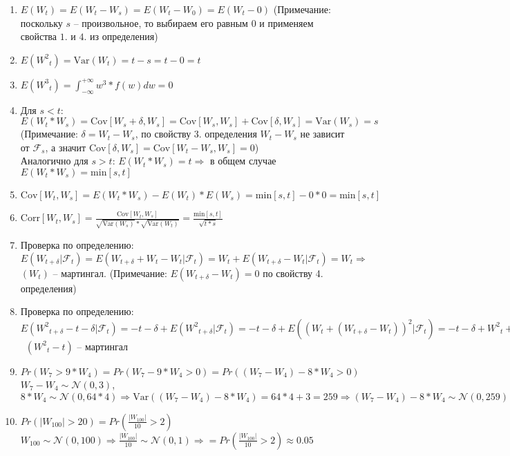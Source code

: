 \documentclass[a4paper]{article}
\begin{document}
\begin{enumerate}
\item $E({W}_t)=E({W}_t-{W}_s)=E({W}_t-{W}_0)=E({W}_t-0)$ (Примечание: поскольку $s$ -- произвольное, то выбираем его равным $0$ и применяем свойства $1.$ и $4.$ из определения)
\item $E({{W}^2}_t)=\text{Var}({W}_t)=t-s=t-0=t$
\item $E({{W}^3}_t)=\int_{-\infty}^{+\infty} w^3 * f(w) dw = 0 $
\item Для $s<t$: $E({W}_t*{W}_s)=\text{Cov}[{W}_s+\delta, {W}_s]=\text{Cov}[{W}_s, {W}_s]+ \text{Cov}[\delta,{W}_s]=\text{Var}({W}_s)=s$ (Примечание: $\delta={W}_t-{W}_s$, по свойству 3. определения ${W}_t-{W}_s$ не зависит от $\mathcal{F}_{s}$, а значит $\text{Cov}[\delta,{W}_s]=\text{Cov}[{W}_t-{W}_s,{W}_s]=0$)
\\ Аналогично для $s>t$: $E({W}_t*{W}_s)=t \Rightarrow$ в общем случае $E({W}_t*{W}_s)=\text{min}[s,t]$
\item $\text{Cov}[{W}_t,{W}_s] =E({W}_t*{W}_s)-E({W}_t)*E({W}_s)=\text{min}[s,t]-0*0=\text{min}[s,t]$
\item $\text{Corr}[{W}_t,{W}_s]=\frac{\text{Cov}[{W}_t,{W}_s]}{ \sqrt{\text{Var}({W}_s)}*\sqrt{\text{Var}({W}_t)}}=\frac{\text{min}[s,t]}{\sqrt{t*s}}$ 
\item Проверка по определению: $E({W}_{t+\delta}|{\mathcal{F}_{t}})=E({W}_{t+\delta}+{W}_{t}-{W}_{t}|{\mathcal{F}_{t}})={W}_{t}+E({W}_{t+\delta}-{W}_{t}|{\mathcal{F}_{t}})={W}_{t} \Rightarrow$ $({W}_{t})$ -- мартингал. (Примечание: $E({W}_{t+\delta}-{W}_{t})=0$ по свойству 4. определения)
\item  Проверка по определению: $E({W^2}_{t+\delta}-t-\delta|{\mathcal{F}_{t}})=-t-\delta+E({W^2}_{t+\delta}|{\mathcal{F}_{t}})=-t-\delta+E(({W}_{t}+({W}_{t+\delta}-{W}_{t}))^2|{\mathcal{F}_{t}})=-t-\delta+{{W}^2}_t + 2{W}_{t}*E({W}_{t+\delta}-{W}_{t})+E(({W}_{t+\delta}-{W}_{t})^2)=-t-\delta+{{W}^2}_t+\text{Var}({W}_{t+\delta}-{W}_{t})={{W}^2}_t-t \Rightarrow$ \ $({{W}^2}_t-t)$ -- мартингал
\item $Pr({W}_7>9*{W}_4)=Pr({W}_7-9*{W}_4>0)=Pr(({W}_7-{W}_4) - 8*{W}_4>0)$ \\ ${W}_7-{W}_4 \sim \mathcal{N}(0,3)$, $8*{W}_4 \sim \mathcal{N}(0,64*4)\Rightarrow \text{Var}(({W}_7-{W}_4) - 8*{W}_4)=64*4+3=259 \Rightarrow ({W}_7-{W}_4) - 8*{W}_4 \sim \mathcal{N}(0,259) \Rightarrow Pr(({W}_7-{W}_4) - 8*{W}_4>0)=\frac{1}{2} $
\item $Pr(\lvert {W}_{100}\rvert >20)=Pr(\frac{\lvert {W}_{100}\rvert}{10} >2)$
\\ ${W}_{100} \sim \mathcal{N}(0,100) \Rightarrow \frac{\lvert {W}_{100}\rvert}{10} \sim \mathcal{N}(0,1) \Rightarrow =Pr(\frac{\lvert {W}_{100}\rvert}{10} >2)\approx0.05$
\end{enumerate}
\end{document}
